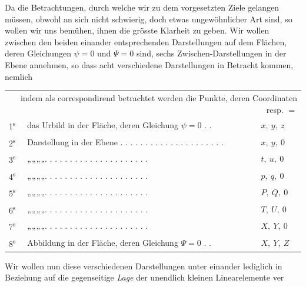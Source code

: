 Da die Betrachtungen, durch welche wir zu dem vorgesetzten Ziele gelangen müssen, obwohl an sich nicht schwierig, doch etwas ungewöhnlicher Art sind, so wollen wir uns bemühen, ihnen die grösste Klarheit zu geben. Wir wollen zwischen den beiden einander entsprechenden Darstellungen auf dem Flächen, deren Gleichungen \(\psi=0\) und \(\Psi=0\) sind, sechs Zwischen-Darstellungen in der Ebene annehmen, so dass acht verschiedene Darstellungen in Betracht kommen, nemlich
\begin{center}
\begingroup\fontsize{8}{10}\selectfont\setlength{\tabcolsep}{2pt}
\begin{tabular}{@{}lll@{}}
\multicolumn{3}{r}{\parbox{1.55in}{\raggedright indem als correspondirend betrachtet werden die Punkte, deren Coordinaten resp. \(=\)}}\\[2pt]
1\textsuperscript{s}&das Urbild in der Fläche, deren Gleichung \(\psi=0\) . .&\(x,\ y,\ z\)\\
2\textsuperscript{s}&Darstellung in der Ebene . . . . . . . . . . . . . . . . . . . . .&\(x,\ y,\ 0\)\\
3\textsuperscript{s}&\quad „\quad „\quad „\quad „\quad . . . . . . . . . . . . . . . . . . . . .&\(t,\ u,\ 0\)\\
4\textsuperscript{s}&\quad „\quad „\quad „\quad „\quad . . . . . . . . . . . . . . . . . . . . .&\(p,\ q,\ 0\)\\
5\textsuperscript{s}&\quad „\quad „\quad „\quad „\quad . . . . . . . . . . . . . . . . . . . . .&\(P,\ Q,\ 0\)\\
6\textsuperscript{s}&\quad „\quad „\quad „\quad „\quad . . . . . . . . . . . . . . . . . . . . .&\(T,\ U,\ 0\)\\
7\textsuperscript{s}&\quad „\quad „\quad „\quad „\quad . . . . . . . . . . . . . . . . . . . . .&\(X,\ Y,\ 0\)\\
8\textsuperscript{s}&Abbildung in der Fläche, deren Gleichung \(\Psi=0\) . .&\(X,\ Y,\ Z\)
\end{tabular}\endgroup
\end{center}
\par\indent Wir wollen nun diese verschiedenen Darstellungen unter einander lediglich in Beziehung auf die gegenseitige \textit{Lage} der unendlich kleinen Linearelemente ver%
